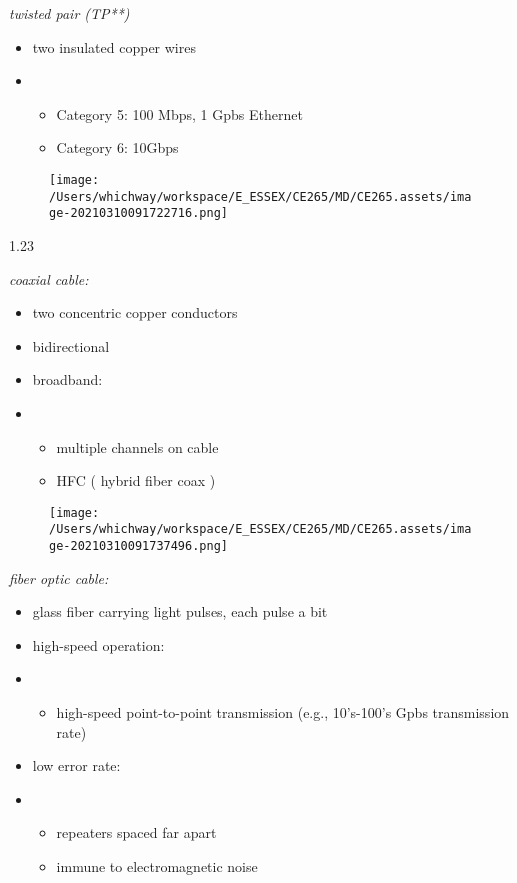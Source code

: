 \documentclass[
]{article}
\begin{document}
\emph{twisted pair (TP**)}

\begin{itemize}
\item
  two insulated copper wires
\item
  \begin{itemize}
  \item
    Category 5: 100 Mbps, 1 Gpbs Ethernet
  \item
    Category 6: 10Gbps
  \end{itemize}
\end{itemize}

\begin{figure}
\centering
\texttt{[image: /Users/whichway/workspace/E\_ESSEX/CE265/MD/CE265.assets/image-20210310091722716.png]}
\caption{}
\end{figure}

1.23

\emph{coaxial cable:}

\begin{itemize}
\item
  two concentric copper conductors
\item
  bidirectional
\item
  broadband:
\item
  \begin{itemize}
  \item
    multiple channels on cable
  \item
    HFC ( hybrid fiber coax )
  \end{itemize}
\end{itemize}

\begin{figure}
\centering
\texttt{[image: /Users/whichway/workspace/E\_ESSEX/CE265/MD/CE265.assets/image-20210310091737496.png]}
\caption{}
\end{figure}

\emph{fiber optic cable:}

\begin{itemize}
\item
  glass fiber carrying light pulses, each pulse a bit
\item
  high-speed operation:
\item
  \begin{itemize}
  \item
    high-speed point-to-point transmission (e.g., 10's-100's Gpbs
    transmission rate)
  \end{itemize}
\item
  low error rate:
\item
  \begin{itemize}
  \item
    repeaters spaced far apart
  \item
    immune to electromagnetic noise
  \end{itemize}
\end{itemize}
\end{document}
